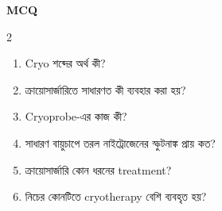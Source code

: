 \begin{practicebox}
\textbf{MCQ}
\begin{multicols}{2}\begin{enumerate}
\item \begin{minipage}[t]{\linewidth}Cryo শব্দের অর্থ কী?\par {}\par\end{minipage}

\item \begin{minipage}[t]{\linewidth}ক্রায়োসার্জারিতে সাধারণত কী ব্যবহার করা হয়?\par {}\par\end{minipage}

\item \begin{minipage}[t]{\linewidth}Cryoprobe-এর কাজ কী?\par {}\par\end{minipage}

\item \begin{minipage}[t]{\linewidth}সাধারণ বায়ুচাপে তরল নাইট্রোজেনের স্ফুটনাঙ্ক প্রায় কত?\par {}\par\end{minipage}

\item \begin{minipage}[t]{\linewidth}ক্রায়োসার্জারি কোন ধরনের treatment?\par {}\par\end{minipage}

\item \begin{minipage}[t]{\linewidth}নিচের কোনটিতে cryotherapy বেশি ব্যবহৃত হয়?\par {}\par\end{minipage}


\end{enumerate}
\end{multicols}
\end{practicebox}
